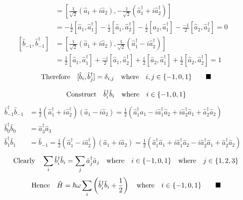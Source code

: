 \documentclass{amsart}
\begin{document}
\begin{align*}
[\hat{b}_{-1},\hat{b}^\dagger_1]&=[\frac{1}{\sqrt{2}}\left(\hat{a}_1+i\hat{a}_2\right),-\frac{1}{\sqrt{2}}\left(\hat{a}^\dagger_1+i\hat{a}^\dagger_2\right)]\\
&=-\frac{1}{2}[\hat{a}_1,\hat{a}^\dagger_1]-\frac{i}{2}[\hat{a}_1,\hat{a}^\dagger_2]-\frac{i}{2}[\hat{a}_2,\hat{a}^\dagger_1]-\frac{-1}{2}[\hat{a}_2,\hat{a}^\dagger_2]=0\\
[\hat{b}_{-1},\hat{b}^\dagger_{-1}]&=[\frac{1}{\sqrt{2}}\left(\hat{a}_1+i\hat{a}_2\right),\frac{1}{\sqrt{2}}\left(\hat{a}^\dagger_1-i\hat{a}^\dagger_2\right)]\\
&=\frac{1}{2}[\hat{a}_1,\hat{a}^\dagger_1]+\frac{-i}{2}[\hat{a}_1,\hat{a}^\dagger_2]+\frac{i}{2}[\hat{a}_2,\hat{a}^\dagger_1]+\frac{1}{2}[\hat{a}_2,\hat{a}^\dagger_2]=1
\end{align*}
\[\qq{Therefore}[\hat{b}_{i},\hat{b}^\dagger_{j}]=\delta_{i,j}\qq{where}i,j\in\{-1,0,1\}\qquad\blacksquare\]

\[\qq{Construct}\hat{b}^\dagger_i\hat{b}_i\qq{where}i\in\{-1,0,1\}\]
\begin{align*}
\hat{b}^\dagger_{-1}\hat{b}_{-1}&=\frac{1}{2}\left(\hat{a}^\dagger_1+i\hat{a}^\dagger_2\right)\left(\hat{a}_1-i\hat{a}_2\right)=\frac{1}{2}\left(\hat{a}^\dagger_1\hat{a}_1-i\hat{a}^\dagger_1\hat{a}_2+i\hat{a}^\dagger_2\hat{a}_1+\hat{a}^\dagger_2\hat{a}_2\right)\\
\hat{b}^\dagger_0\hat{b}_0&=\hat{a}^\dagger_3\hat{a}_3\\
\hat{b}^\dagger_1\hat{b}_1&=\hat{b}_{-1}=\frac{1}{2}\left(\hat{a}^\dagger_1-i\hat{a}^\dagger_2\right)\left(\hat{a}_1+i\hat{a}_2\right)=\frac{1}{2}\left(\hat{a}^\dagger_1\hat{a}_1+i\hat{a}^\dagger_1\hat{a}_2-i\hat{a}^\dagger_2\hat{a}_1+\hat{a}^\dagger_2\hat{a}_2\right)
\end{align*}
\[\qq{Clearly}\sum_i \hat{b}^\dagger_{i}\hat{b}_{i}=\sum_j \hat{a}^\dagger_{j}\hat{a}_{j}\qq{where}i\in\{-1,0,1\}\qq{where}j\in\{1,2,3\}\]
\[\qq{Hence}\hat{H}=\hbar\omega\sum_i\left(\hat{b}^\dagger_i\hat{b}_i+\frac{1}{2}\right)\qq{where}i\in\{-1,0,1\}\qquad\blacksquare\]
\end{document}
